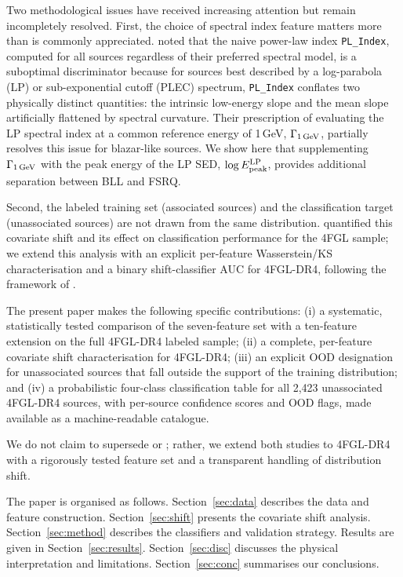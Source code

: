 \documentclass[fleqn,12pt]{article}
\newcommand{\fgl}{4FGL-DR4}
\newcommand{\GamLP}{\Gamma_{\rm 1\,GeV}}
\newcommand{\Epeak}{E^{\rm LP}_{\rm peak}}
\begin{document}
Two methodological issues have received increasing attention but
remain incompletely resolved. First, the choice of spectral index
feature matters more than is commonly appreciated.
\citet{Malyshev2023} noted that the naive power-law index
\texttt{PL\_Index}, computed for all sources regardless of their
preferred spectral model, is a suboptimal discriminator because for
sources best described by a log-parabola (LP) or sub-exponential
cutoff (PLEC) spectrum, \texttt{PL\_Index} conflates two physically
distinct quantities: the intrinsic low-energy slope and the mean
slope artificially flattened by spectral curvature. Their prescription
of evaluating the LP spectral index at a common reference energy of
1\,GeV, $\GamLP$, partially resolves this issue for blazar-like
sources. We show here that supplementing $\GamLP$ with the peak
energy of the LP SED, $\log\Epeak$, provides additional separation
between BLL and FSRQ.

Second, the labeled training set (associated sources) and the
classification target (unassociated sources) are not drawn from the
same distribution. \citet{MalyshevRASTI2023} quantified this covariate
shift and its effect on classification performance for the 4FGL
sample; we extend this analysis with an explicit per-feature
Wasserstein/KS characterisation and a binary shift-classifier AUC for
\fgl{}, following the framework of \citet{Shimodaira2000}.

The present paper makes the following specific contributions:
(i) a systematic, statistically tested comparison of the
\citet{Malyshev2023} seven-feature set with a ten-feature extension
on the full \fgl{} labeled sample;
(ii) a complete, per-feature covariate shift characterisation for
\fgl{};
(iii) an explicit OOD designation for unassociated sources that fall
outside the support of the training distribution;
and (iv) a probabilistic four-class classification table for all 2,423
unassociated \fgl{} sources, with per-source confidence scores and OOD
flags, made available as a machine-readable catalogue.

We do not claim to supersede \citet{Malyshev2023} or \citet{Zhu2024};
rather, we extend both studies to \fgl{} with a rigorously
tested feature set and a transparent handling of distribution shift.

The paper is organised as follows. Section~\ref{sec:data} describes the
data and feature construction. Section~\ref{sec:shift} presents the
covariate shift analysis. Section~\ref{sec:method} describes the
classifiers and validation strategy. Results are given in
Section~\ref{sec:results}. Section~\ref{sec:disc} discusses the
physical interpretation and limitations. Section~\ref{sec:conc}
summarises our conclusions.
\end{document}
